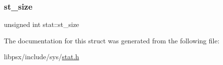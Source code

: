 \mbox{\label{structstat_af4a3c7f1e38a875f5e01700937482132}} 
\subsubsection{\texorpdfstring{st\+\_\+size}{st\_size}}
{\footnotesize\ttfamily unsigned int stat\+::st\+\_\+size}



The documentation for this struct was generated from the following file\+:\begin{DoxyCompactItemize}
\item 
libpsx/include/sys/\hyperlink{stat_8h}{stat.\+h}\end{DoxyCompactItemize}
